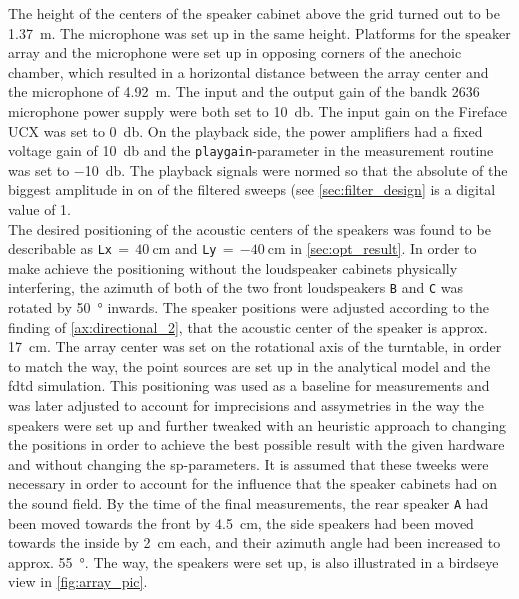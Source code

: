 The height of the centers of the speaker cabinet above the grid turned out to be \SI{1.37}{\meter}. The microphone was set up in the same height. Platforms for the speaker array and the microphone were set up in opposing corners of the anechoic chamber, which resulted in a horizontal distance between the array center and the microphone of \SI{4.92}{\meter}.
The input and the output gain of the \gls{bandk} 2636 microphone power supply were both set to \SI{+10}{\decibel}. The input gain on the Fireface UCX was set to \SI{0}{\decibel}. On the playback side, the power amplifiers had a fixed voltage gain of \SI{+10}{\decibel} and the \texttt{playgain}-parameter in the measurement routine was set to \SI{-10}{\decibel}. The playback signals were normed so that the absolute of the biggest amplitude in on of the filtered sweeps (see \autoref{sec:filter_design} is a digital value of 1.\\
The desired positioning of the acoustic centers of the speakers was found to be describable as \texttt{Lx}$\,=\,\SI{40}{\centi\meter}$ and \texttt{Ly}$\,=\,\SI{-40}{\centi\meter}$ in \autoref{sec:opt_result}. In order to make achieve the positioning without the loudspeaker cabinets physically interfering, the azimuth of both of the two front loudspeakers \texttt{B} and \texttt{C} was rotated by \SI{50}{\degree} inwards. The speaker positions were adjusted according to the finding of \autoref{ax:directional_2}, that the acoustic center of the speaker is approx. \SI{17}{\centi\meter}. The array center was set on the rotational axis of the turntable, in order to match the way, the point sources are set up in the analytical model and the \gls{fdtd} simulation.
This positioning was used as a baseline for measurements and was later adjusted to account for imprecisions and assymetries in the way the speakers were set up and further tweaked with an heuristic approach to changing the positions in order to achieve the best possible result with the given hardware and without changing the \gls{sp}-parameters. It is assumed that these tweeks were necessary in order to account for the influence that the speaker cabinets had on the sound field. By the time of the final measurements, the rear speaker \texttt{A} had been moved towards the front by \SI{4.5}{\centi\meter}, the side speakers had been moved towards the inside by \SI{2}{\centi\meter} each, and their azimuth angle had been increased to approx. \SI{55}{\degree}.
The way, the speakers were set up, is also illustrated in a birdseye view in \autoref{fig:array_pic}.


